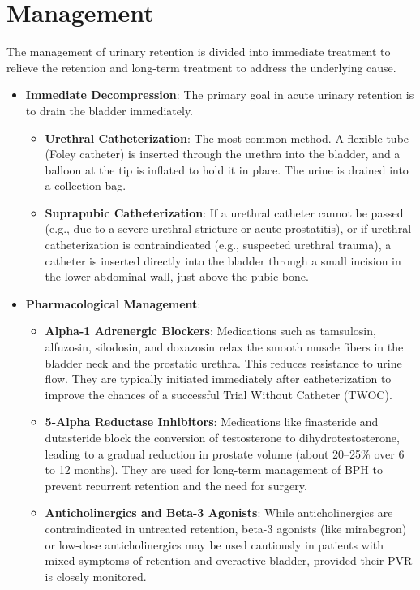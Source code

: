 \section*{Management}
The management of urinary retention is divided into immediate treatment to relieve the retention and long-term treatment to address the underlying cause.
\begin{itemize}
    \item \textbf{Immediate Decompression}: The primary goal in acute urinary retention is to drain the bladder immediately.
    \begin{itemize}
        \item \textbf{Urethral Catheterization}: The most common method. A flexible tube (Foley catheter) is inserted through the urethra into the bladder, and a balloon at the tip is inflated to hold it in place. The urine is drained into a collection bag.
        \item \textbf{Suprapubic Catheterization}: If a urethral catheter cannot be passed (e.g., due to a severe urethral stricture or acute prostatitis), or if urethral catheterization is contraindicated (e.g., suspected urethral trauma), a catheter is inserted directly into the bladder through a small incision in the lower abdominal wall, just above the pubic bone.
    \end{itemize}
    \item \textbf{Pharmacological Management}:
    \begin{itemize}
        \item \textbf{Alpha-1 Adrenergic Blockers}: Medications such as tamsulosin, alfuzosin, silodosin, and doxazosin relax the smooth muscle fibers in the bladder neck and the prostatic urethra. This reduces resistance to urine flow. They are typically initiated immediately after catheterization to improve the chances of a successful Trial Without Catheter (TWOC).
        \item \textbf{5-Alpha Reductase Inhibitors}: Medications like finasteride and dutasteride block the conversion of testosterone to dihydrotestosterone, leading to a gradual reduction in prostate volume (about 20--25\% over 6 to 12 months). They are used for long-term management of BPH to prevent recurrent retention and the need for surgery.
        \item \textbf{Anticholinergics and Beta-3 Agonists}: While anticholinergics are contraindicated in untreated retention, beta-3 agonists (like mirabegron) or low-dose anticholinergics may be used cautiously in patients with mixed symptoms of retention and overactive bladder, provided their PVR is closely monitored.

\end{itemize}
\end{itemize}

